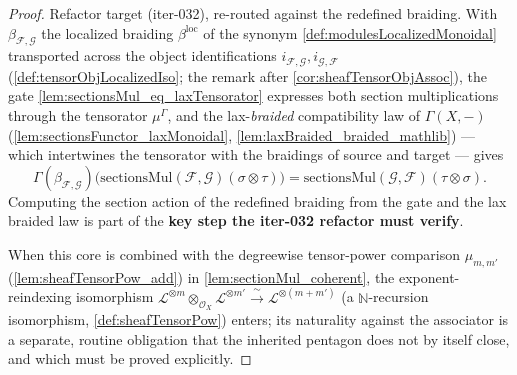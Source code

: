 \begin{proof}
  Refactor target (iter-032), re-routed against the redefined braiding. With
  \(\beta_{\mathcal{F},\mathcal{G}}\) the localized braiding \(\beta^{\mathrm{loc}}\)
  of the synonym \cref{def:modulesLocalizedMonoidal} transported across the object
  identifications \(i_{\mathcal{F},\mathcal{G}}, i_{\mathcal{G},\mathcal{F}}\)
  (\cref{def:tensorObjLocalizedIso}; the remark after
  \cref{cor:sheafTensorObjAssoc}), the gate \cref{lem:sectionsMul_eq_laxTensorator}
  expresses both section multiplications through the tensorator \(\mu^{\Gamma}\),
  and the lax-\emph{braided} compatibility law of \(\Gamma(X,-)\)
  (\cref{lem:sectionsFunctor_laxMonoidal}, \cref{lem:laxBraided_braided_mathlib})
  --- which intertwines the tensorator with the braidings of source and target ---
  gives
  \[
    \Gamma(\beta_{\mathcal{F},\mathcal{G}})
      \bigl(\mathrm{sectionsMul}(\mathcal{F},\mathcal{G})(\sigma \otimes \tau)\bigr)
      = \mathrm{sectionsMul}(\mathcal{G},\mathcal{F})(\tau \otimes \sigma).
  \]
  Computing the section action of the redefined braiding from the gate and the lax
  braided law is part of the \textbf{key step the iter-032 refactor must verify}.

  When this core is combined with the degreewise tensor-power comparison
  \(\mu_{m,m'}\) (\cref{lem:sheafTensorPow_add}) in \cref{lem:sectionMul_coherent},
  the exponent-reindexing isomorphism \(\mathcal{L}^{\otimes m} \otimes_{\mathcal{O}_X}
  \mathcal{L}^{\otimes m'} \xrightarrow{\ \sim\ } \mathcal{L}^{\otimes (m+m')}\)
  (a \(\mathbb{N}\)-recursion isomorphism, \cref{def:sheafTensorPow}) enters; its
  naturality against the associator is a separate, routine obligation that the
  inherited pentagon does not by itself close, and which must be proved explicitly.
\end{proof}

